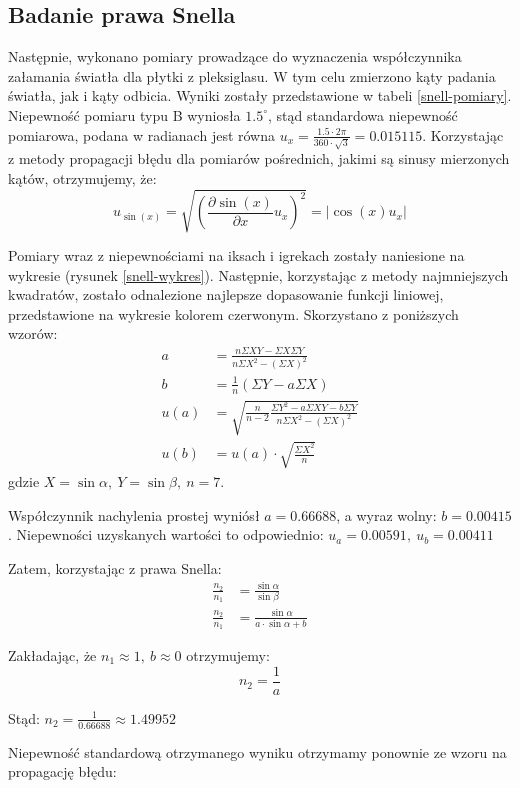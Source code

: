 \documentclass[a4paper]{article}
\newlength{\du}
\begin{document}
\subsection{Badanie prawa Snella}
Następnie, wykonano pomiary prowadzące do wyznaczenia współczynnika załamania światła dla płytki z pleksiglasu.
W tym celu zmierzono kąty padania światła, jak i kąty odbicia.
Wyniki zostały przedstawione w tabeli \ref{snell-pomiary}.
Niepewność pomiaru typu B wyniosła $1.5^\circ$, stąd standardowa niepewność pomiarowa, podana w radianach jest równa $u_x = \frac{1.5 \cdot 2 \pi}{360 \cdot \sqrt{3}} = 0.015115$.
Korzystając z metody propagacji błędu dla pomiarów pośrednich, jakimi są sinusy mierzonych kątów, otrzymujemy, że:
\[
	u_{\sin(x)} = \sqrt{\left(\frac{\partial \sin(x)}{\partial x}u_{x}\right)^2} = \left|\cos(x)u_{x}\right|
\]

Pomiary wraz z niepewnościami na iksach i igrekach zostały naniesione na wykresie (rysunek \ref{snell-wykres}).
Następnie, korzystając z metody najmniejszych kwadratów, zostało odnalezione najlepsze dopasowanie funkcji liniowej, przedstawione na wykresie kolorem czerwonym.
Skorzystano z poniższych wzorów:
\begin{align*}
a &= \frac{n \Sigma X Y - \Sigma X \Sigma Y}{n \Sigma X^2 - \left(\Sigma X\right)^2} \\
b &= \frac{1}{n}\left(\Sigma Y - a \Sigma X\right) \\
u(a) &= \sqrt{\frac{n}{n-2} \frac{\Sigma Y^2 - a\Sigma XY - b\Sigma Y}{n\Sigma X^2-\left(\Sigma X \right)^2}} \\
u(b) &= u(a)\cdot \sqrt{\frac{\Sigma X^2}{n}}
\end{align*}
gdzie $X = \sin\alpha, \ Y = \sin\beta, \ n = 7$.


Współczynnik nachylenia prostej wyniósł $a = 0.66688$, a wyraz wolny: $b = 0.00415$.
Niepewności uzyskanych wartości to odpowiednio:
$ u_a=0.00591, \ u_b=0.00411 $

Zatem, korzystając z prawa Snella:
\begin{align*}
\frac{n_2}{n_1} &= \frac{\sin\alpha}{\sin\beta} \\ 
\frac{n_2}{n_1} &= \frac{\sin\alpha}{a \cdot \sin\alpha + b}
\end{align*}

Zakładając, że $n_1 \approx 1, \ b \approx 0$ otrzymujemy:
\[ n_2 = \frac{1}{a}\]

Stąd: $n_2 = \frac{1}{0.66688} \approx 1.49952$

Niepewność standardową otrzymanego wyniku otrzymamy ponownie ze wzoru na propagację błędu:
\end{document}
